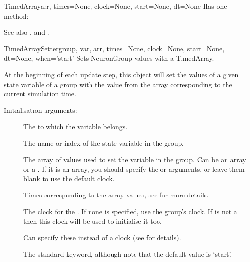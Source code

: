 \documentclass[letterpaper,10pt,english]{manual}
\begin{document}
\begin{classdesc}{TimedArray}{arr, times=None, clock=None, start=None, dt=None}
Has one method:

See also \hyperlink{brian.TimedArraySetter}{}, \hyperlink{brian.set_group_var_by_array}{} and
\hyperlink{brian.NeuronGroup}{}.
\end{classdesc}

\hypertarget{brian.TimedArraySetter}{}\begin{classdesc}{TimedArraySetter}{group, var, arr, times=None, clock=None, start=None, dt=None, when='start'}
Sets NeuronGroup values with a TimedArray.

At the beginning of each update step, this object will set the
values of a given state variable of a group with the value from
the array corresponding to the current simulation time.

Initialisation arguments:
\begin{description}
\item[] \leavevmode
The \hyperlink{brian.NeuronGroup}{} to which the variable belongs.

\item[] \leavevmode
The name or index of the state variable in the group.

\item[] \leavevmode
The array of values used to set the variable in the group.
Can be an array or a \hyperlink{brian.TimedArray}{}. If it is an array,
you should specify the  or  arguments, or
leave them blank to use the default clock.

\item[] \leavevmode
Times corresponding to the array values, see \hyperlink{brian.TimedArray}{}
for more details.

\item[] \leavevmode
The clock for the \hyperlink{brian.NetworkOperation}{}. If none is specified,
use the group's clock. If  is not a \hyperlink{brian.TimedArray}{}
then this clock will be used to initialise it too.

\item[] \leavevmode
Can specify these instead of a clock (see \hyperlink{brian.TimedArray}{} for
details).

\item[] \leavevmode
The standard \hyperlink{brian.NetworkOperation}{}  keyword, although
note that the default value is `start'.

\end{description}
\end{classdesc}
\end{document}
